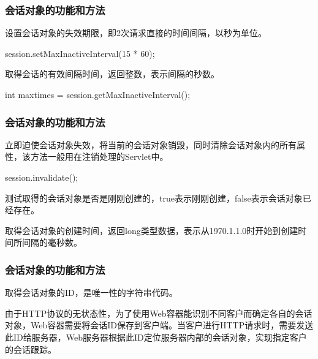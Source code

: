 \begin{frame}[fragile] %
\frametitle{会话对象的功能和方法} 


设置会话对象的失效期限，即2次请求直接的时间间隔，以秒为单位。
\begin{javaCode}
session.setMaxInactiveInterval(15 * 60);
\end{javaCode}


取得会话的有效间隔时间，返回整数，表示间隔的秒数。
\begin{javaCode}
int maxtimes = session.getMaxInactiveInterval();
\end{javaCode}
\end{frame}

\begin{frame}[fragile] %
\frametitle{会话对象的功能和方法} 


立即迫使会话对象失效，将当前的会话对象销毁，同时清除会话对象内的所有属性，该方法一般用在注销处理的Servlet中。
\begin{javaCode}
session.invalidate();
\end{javaCode}


测试取得的会话对象是否是刚刚创建的，true表示刚刚创建，false表示会话对象已经存在。


取得会话对象的创建时间，返回long类型数据，表示从1970.1.1.0时开始到创建时间所间隔的毫秒数。
\end{frame}

\begin{frame}[fragile] %
\frametitle{会话对象的功能和方法} 


取得会话对象的ID，是唯一性的字符串代码。

{\kai\Blue 由于HTTP协议的无状态性，为了使用Web容器能识别不同客户而确定各自的会话对象，Web容器需要将会话ID保存到客户端。当客户进行HTTP请求时，需要发送此ID给服务器，Web服务器根据此ID定位服务器内部的会话对象，实现指定客户的会话跟踪。}
\end{frame}


